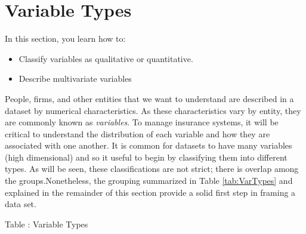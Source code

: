 \documentclass[]{book}
\providecommand{\tightlist}{%
  \setlength{\itemsep}{0pt}\setlength{\parskip}{0pt}}
\theoremstyle{definition}
\theoremstyle{definition}
\theoremstyle{definition}
\theoremstyle{remark}
\begin{document}
\section{Variable Types}\label{S:VarTypes}

In this section, you learn how to:

\begin{itemize}
\tightlist
\item
  Classify variables as qualitative or quantitative.
\item
  Describe multivariate variables
\end{itemize}

People, firms, and other entities that we want to understand are
described in a dataset by numerical characteristics. As these
characteristics vary by entity, they are commonly known as
\emph{variables}. To manage insurance systems, it will be critical to
understand the distribution of each variable and how they are associated
with one another. It is common for datasets to have many variables (high
dimensional) and so it useful to begin by classifying them into
different types. As will be seen, these classifications are not strict;
there is overlap among the groups.Nonetheless, the grouping summarized
in Table \ref{tab:VarTypes} and explained in the remainder of this
section provide a solid first step in framing a data set.

Table : \label{tab:VarTypes} Variable Types
\end{document}
